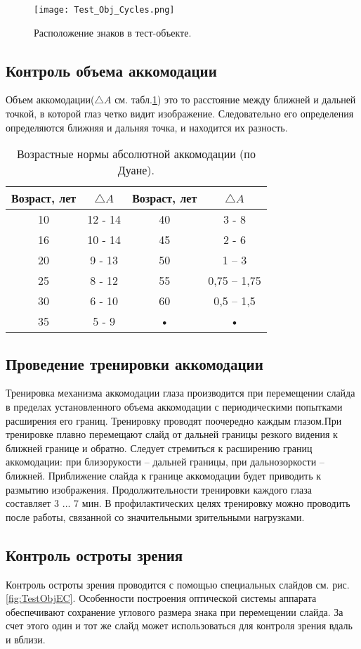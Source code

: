 \begin{figure}[ht]
\centering
        \texttt{[image: Test\_Obj\_Cycles.png]}
        \caption{Расположение знаков в тест-объекте.}
    \label{fig:TestObjC}
\end{figure}
\subsection{Контроль объема аккомодации}
Объем аккомодации($\triangle A$ см. табл.\ref{tab:AccDuane}) это то расстояние между ближней и дальней точкой, в которой глаз четко видит изображение. Следовательно его определения определяются ближняя и дальняя точка, и находится их разность.
\begin{table}
\centering
\begin{tabular}{|c|c|c|c|}
\hline 
Возраст, лет &$\triangle A$ & Возраст, лет & $\triangle A$ \\ 
\hline 
10 & 12 - 14 & 40 & 3 - 8 \\ 
\hline 
16 & 10 - 14 & 45 & 2 - 6 \\ 
\hline 
20 & 9 - 13 & 50 & 1 – 3 \\ 
\hline 
25 & 8 - 12 & 55 & 0,75 – 1,75 \\ 
\hline 
30 & 6 - 10 & 60 & 0,5 – 1,5 \\ 
\hline 
35 & 5 - 9 & • & • \\ 
\hline 
\end{tabular} 
\caption{Возрастные нормы абсолютной аккомодации (по Дуане).}
\label{tab:AccDuane}
\end{table}
\subsection{Проведение тренировки аккомодации}
Тренировка механизма аккомодации глаза производится при перемещении слайда в пределах установленного объема аккомодации с периодическими попытками расширения его границ. Тренировку проводят поочередно каждым глазом.При тренировке плавно перемещают слайд от дальней границы резкого видения к ближней границе и обратно. Следует стремиться к расширению границ аккомодации: при близорукости – дальней границы, при дальнозоркости – ближней. Приближение слайда к границе аккомодации будет приводить к размытию изображения.  Продолжительности тренировки каждого глаза составляет 3 ... 7 мин. В профилактических целях тренировку можно проводить после работы, связанной со значительными зрительными нагрузками.
\subsection{Контроль остроты зрения}
Контроль остроты зрения проводится с помощью специальных слайдов см. рис.\ref{fig:TestObjEC}. Особенности построения оптической системы аппарата обеспечивают сохранение углового размера знака при перемещении слайда. За счет этого один и тот же слайд может использоваться для контроля зрения вдаль и вблизи.

